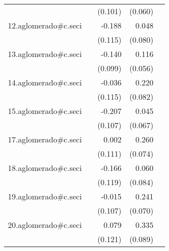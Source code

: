 {\begin{longtable}{l*{4}{D{.}{.}{-1}}}
            &                     &     (0.101)         &     (0.060)         &                     \\
\addlinespace
12.aglomerado#c.seci&                     &      -0.188         &       0.048         &                     \\
            &                     &     (0.115)         &     (0.080)         &                     \\
\addlinespace
13.aglomerado#c.seci&                     &      -0.140         &       0.116\sym{*}  &                     \\
            &                     &     (0.099)         &     (0.056)         &                     \\
\addlinespace
14.aglomerado#c.seci&                     &      -0.036         &       0.220\sym{**} &                     \\
            &                     &     (0.115)         &     (0.082)         &                     \\
\addlinespace
15.aglomerado#c.seci&                     &      -0.207         &       0.045         &                     \\
            &                     &     (0.107)         &     (0.067)         &                     \\
\addlinespace
17.aglomerado#c.seci&                     &       0.002         &       0.260\sym{***}&                     \\
            &                     &     (0.111)         &     (0.074)         &                     \\
\addlinespace
18.aglomerado#c.seci&                     &      -0.166         &       0.060         &                     \\
            &                     &     (0.119)         &     (0.084)         &                     \\
\addlinespace
19.aglomerado#c.seci&                     &      -0.015         &       0.241\sym{***}&                     \\
            &                     &     (0.107)         &     (0.070)         &                     \\
\addlinespace
20.aglomerado#c.seci&                     &       0.079         &       0.335\sym{***}&                     \\
            &                     &     (0.121)         &     (0.089)         &                     \\

\end{longtable}}
